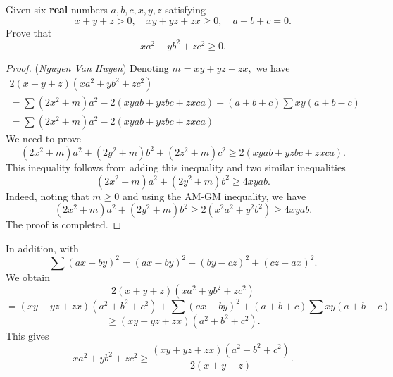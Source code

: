 \documentclass[12pt,a4paper]{book}
\begin{document}
\begin{pro_no_count}
Given six \textbf{real} numbers $a, b, c, x, y, z$ satisfying
$$x+y+z>0, \quad x y+y z+z x \geqslant 0, \quad a+b+c=0.$$
Prove that
$$x a^2+y b^2+z c^2 \geqslant 0.$$
\end{pro_no_count}

\begin{proof} (\textit{Nguyen Van Huyen}) 
Denoting $m=x y+y z+z x,$ we have
$$
\begin{gathered}
2(x+y+z)(x a^2+y b^2+z c^2) \\
=\sum (2 x^2+m) a^2-2(x y a b+y z b c+z x c a)+(a+b+c) \sum x y(a+b-c) \\
=\sum (2 x^2+m) a^2-2(x y a b+y z b c+z x c a)
\end{gathered}
$$
We need to prove
$$(2 x^2+m) a^2+(2 y^2+m) b^2+(2 z^2+m) c^2 \geqslant 2(x y a b+y z b c+z x c a).$$
This inequality follows from adding this inequality and two similar inequalities
$$(2x^2+m)a^2 + (2y^2+m)b^2 \ge 4 x y a b.$$
Indeed, noting that $m \geqslant 0$ and using the AM-GM inequality, we have
$$(2 x^2+m) a^2+(2 y^2+m) b^2 \geqslant 2(x^2 a^2+y^2 b^2) \geqslant 4xyab.$$
The proof is completed.
\end{proof}

\begin{note}
In addition, with
\[\sum (ax-by)^2 = (ax-by)^2 + (by-cz)^2 + (cz-ax)^2.\]
We obtain
\[2(x+y+z)(xa^2+yb^2+zc^2)\]
\[= (xy+yz+zx)(a^2+b^2+c^2) + \sum (ax-by)^2 + (a+b+c) \sum xy(a+b-c)\]
\[\ge (xy+yz+zx)(a^2+b^2+c^2).\]
This gives
\[xa^2+yb^2+zc^2 \ge \frac{(xy+yz+zx)(a^2+b^2+c^2)}{2(x+y+z)}.\]
\end{note}
\end{document}
